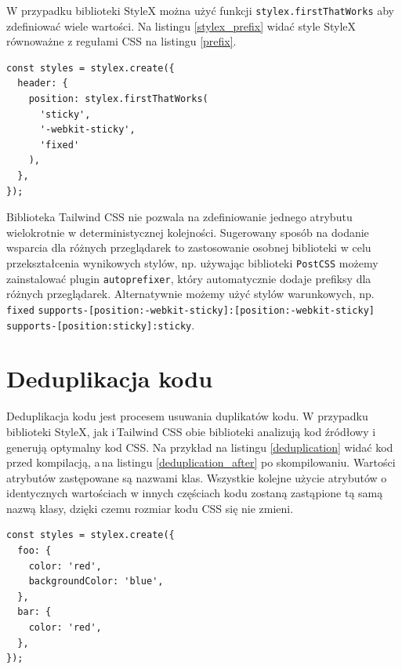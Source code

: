 \documentclass[a4paper,12pt]{book} %
\begin{document}
W przypadku biblioteki StyleX można użyć funkcji \lstinline|stylex.firstThatWorks| aby zdefiniować wiele wartości. Na listingu \ref{stylex_prefix} widać style StyleX równoważne z regułami CSS na listingu \ref{prefix}.
\begin{lstfloat}[hb]
  \lstset{language=HTML}
  \begin{lstlisting}[frame=single]
const styles = stylex.create({
  header: {
    position: stylex.firstThatWorks(
      'sticky',
      '-webkit-sticky',
      'fixed'
    ),
  },
});
\end{lstlisting}
  \caption{Prefiksy w StyleX}\label{stylex_prefix}
\end{lstfloat}

Biblioteka Tailwind CSS nie pozwala na zdefiniowanie jednego atrybutu wielokrotnie w deterministycznej kolejności. Sugerowany sposób na dodanie wsparcia dla różnych przeglądarek to zastosowanie osobnej biblioteki w celu przekształcenia wynikowych stylów, np. używając biblioteki \lstinline|PostCSS| możemy zainstalować plugin \lstinline|autoprefixer|, który automatycznie dodaje prefiksy dla różnych przeglądarek. Alternatywnie możemy użyć stylów warunkowych, np. \lstinline|fixed| \lstinline|supports-[position:-webkit-sticky]:[position:-webkit-sticky]| \lstinline|supports-[position:sticky]:sticky|.

\section{Deduplikacja kodu}
Deduplikacja kodu jest procesem usuwania duplikatów kodu. W przypadku biblioteki StyleX, jak i\,Tailwind CSS obie biblioteki analizują kod źródłowy i\,generują optymalny kod CSS. Na przykład na listingu \ref{deduplication} widać kod przed kompilacją, a\,na listingu \ref{deduplication_after} po skompilowaniu. Wartości atrybutów zastępowane są nazwami klas. Wszystkie kolejne użycie atrybutów o\,identycznych wartościach w innych częściach kodu zostaną zastąpione tą samą nazwą klasy, dzięki czemu rozmiar kodu CSS się nie zmieni.

\begin{lstfloat}[hb]
  \lstset{language=HTML}
  \begin{lstlisting}[frame=single]
const styles = stylex.create({
  foo: {
    color: 'red',
    backgroundColor: 'blue',
  },
  bar: {
    color: 'red',
  },
});
\end{lstlisting}
  \caption{Kod w StyleX przed kompilacją \cite{StyleX}}\label{deduplication}
\end{lstfloat}
\end{document}
